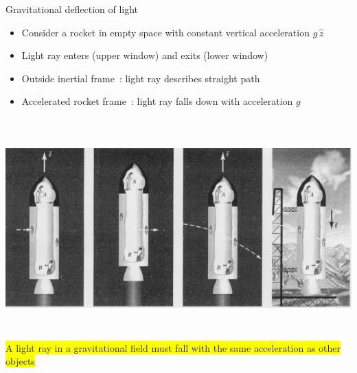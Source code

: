 \Tr
\onecolumn
\begin{center}
{\blue Gravitational deflection of light}
\end{center}
\begin{itemize}
\item Consider a rocket in empty space with constant vertical acceleration $g\,\hat{z}$
\item[] Light ray enters (upper window) and exits (lower window)
\item[] Outside inertial frame~: light ray describes straight path
\item[] Accelerated rocket frame~: light ray falls down with acceleration $g$
\end{itemize}
%
\begin{center}
\includegraphics[keepaspectratio,height=8.5cm]{light}\\
\colorbox{yellow}{A light ray in a gravitational field must fall with the same acceleration as other objects} 
\end{center}
%
